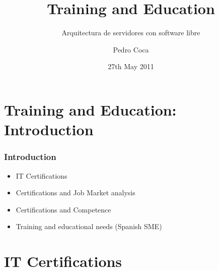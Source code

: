 \documentclass{beamer}
\begin{document}
\title{Training and Education}
\subtitle{Arquitectura de servidores con software libre}
\author{Pedro Coca}
\date{27th May 2011}



\section{Training and Education: Introduction}

\begin{frame}
\frametitle{Introduction}
\begin{itemize}
\item IT Certifications
\item Certifications and Job Market analysis
\item Certifications and Competence
\item Training and educational needs (Spanish SME)
\end{itemize}
\end{frame}


\section{IT Certifications}

\end{document}
